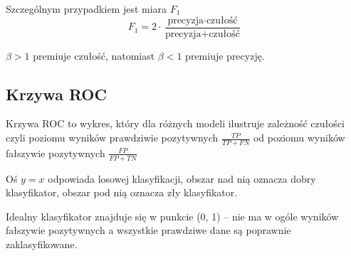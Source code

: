 Szczególnym przypadkiem jest miara \( F_1 \)
\[
F_1 = 2 \cdot \frac{\text{precyzja} \cdot \text{czułość}}{\text{precyzja} + \text{czułość}}
\]

\( \beta > 1 \) premiuje czułość, natomiast \( \beta < 1 \) premiuje precyzję.

\subsection{Krzywa ROC}

Krzywa ROC to wykres, który dla różnych modeli ilustruje zależność czułości czyli poziomu wyników prawdziwie pozytywnych \( \frac{TP}{TP + FN} \) od poziomu wyników fałszywie pozytywnych \( \frac{FP}{FP + TN} \)

Oś \( y = x \) odpowiada losowej klasyfikacji, obszar nad nią oznacza dobry klasyfikator, obszar pod nią oznacza zły klasyfikator.

Idealny klasyfikator znajduje się w punkcie (0, 1) -- nie ma w ogóle wyników fałszywie pozytywnych a wszystkie prawdziwe dane są poprawnie zaklasyfikowane.
